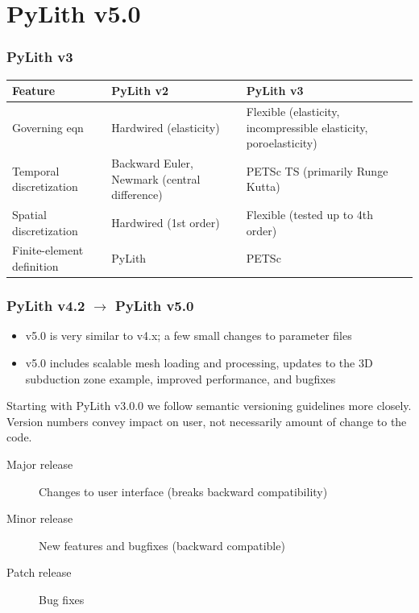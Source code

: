 \documentclass[aspectratio=169]{beamer}
\begin{document}
\section{PyLith v5.0}

\begin{frame}
  \frametitle{PyLith v3}

  \footnotesize{\begin{tabular}{p{3.0cm}p{5.0cm}p{5.0cm}}
    \toprule
    Feature
    & PyLith v2
    & PyLith v3 \\
    \midrule
    Governing eqn
    & Hardwired (elasticity)
    & Flexible (elasticity, incompressible elasticity, poroelasticity)
    \\[2em]
    Temporal discretization
    & Backward Euler, Newmark (central difference)
    & PETSc TS (primarily Runge Kutta)
      \\[2em]
    Spatial discretization
    & Hardwired (1st order)
    & Flexible (tested up to 4th order)
           \\[1em]
           Finite-element definition
           & PyLith
           & PETSc \\
    \bottomrule
  \end{tabular}}
    
\end{frame}


\begin{frame}
  \frametitle{PyLith v4.2 $\rightarrow$ PyLith v5.0}
  \summary{}

  \begin{itemize}
  \item v5.0 is very similar to v4.x; a few small changes to parameter files
  \item v5.0 includes scalable mesh loading and processing, updates to the 3D subduction zone example, improved performance, and bugfixes
  \end{itemize}

  \vfill\pause

  Starting with PyLith v3.0.0 we follow semantic versioning guidelines more closely.\\
  Version numbers convey impact on user, not necessarily amount of change to the code.

  \begin{description}
  \item[Major release] Changes to user interface (breaks backward compatibility)
  \item[Minor release] New features and bugfixes (backward compatible)
  \item[Patch release] Bug fixes
  \end{description}
    
\end{frame}
\end{document}
